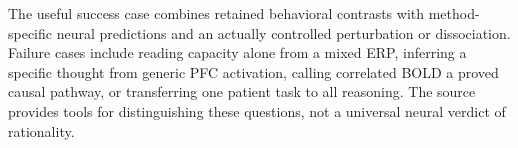 The useful success case combines retained behavioral contrasts
with method-specific neural predictions and an actually controlled
perturbation or dissociation. Failure cases include reading capacity
alone from a mixed ERP, inferring a specific thought from generic
PFC activation, calling correlated BOLD a proved causal pathway,
or transferring one patient task to all reasoning. The source
provides tools for distinguishing these questions, not a universal
neural verdict of rationality.

